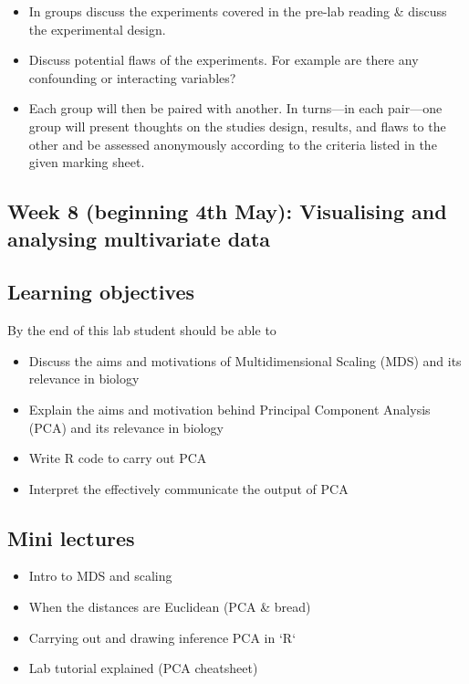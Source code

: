 \documentclass{article}
\begin{document}
\begin{itemize}
\item In groups discuss the experiments covered in the pre-lab reading \& discuss the experimental design. 
\item Discuss potential flaws of the experiments. For example are there any confounding or interacting variables?
  \item Each group will then be paired with another. In turns---in each pair---one group will present thoughts on the studies design, results, and flaws to the other and be assessed anonymously according to the criteria listed in the given marking sheet.
\end{itemize}


\newpage

\subsection*{Week 8 (beginning 4th May): Visualising and analysing multivariate data}
\subsection*{Learning objectives}
By the end of this lab student should be able to
\begin{itemize}
\item Discuss the aims and motivations of Multidimensional Scaling (MDS) and its relevance in biology
   \item Explain the aims and motivation behind Principal Component Analysis (PCA) and its relevance in biology
   \item Write R code to carry out PCA
   \item Interpret the effectively communicate the output of PCA
\end{itemize}

\subsection*{Mini lectures}

\begin{itemize}
\item Intro to MDS and scaling
\item When the distances are Euclidean (PCA \& bread)
\item Carrying out and drawing inference PCA in `R`
\item Lab tutorial explained (PCA cheatsheet)
\end{itemize}
\end{document}
